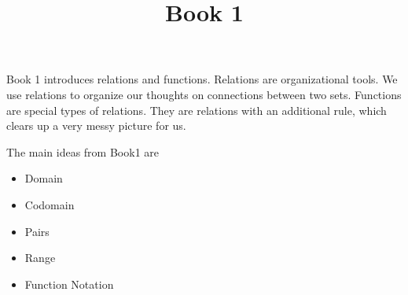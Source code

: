 \documentclass{ximera}
\title{Book 1}
\begin{document}
\begin{abstract}
\end{abstract}

\maketitle

\begin{sectionOutcomes}

Book 1 introduces relations and functions. Relations are organizational tools.  We use relations to organize our thoughts on connections between two sets. Functions are special types of relations.  They are relations with an additional rule, which clears up a very messy picture for us. 

The main ideas from Book1 are

\begin{itemize}
\item Domain 
\item Codomain
\item Pairs
\item Range
\item Function Notation
\end{itemize}

\end{sectionOutcomes}
\end{document}
